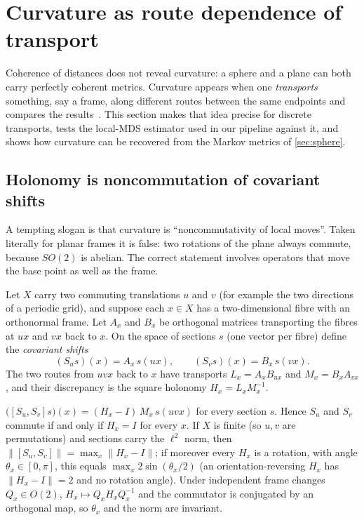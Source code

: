\documentclass[11pt]{article}
\begin{document}
 \section{Curvature as route dependence of transport}
\label{sec:curvature}

Coherence of distances does not reveal curvature: a sphere and a plane can both carry perfectly coherent metrics.
Curvature appears when one \emph{transports} something, say a frame, along different routes between the same endpoints and compares the results~\cite{Lee1997Riemannian}.
This section makes that idea precise for discrete transports, tests the local-MDS estimator used in our pipeline against it, and shows how curvature can be recovered from the Markov metrics of \cref{sec:sphere}.

\subsection{Holonomy is noncommutation of covariant shifts}
\label{sec:connection}

A tempting slogan is that curvature is ``noncommutativity of local moves''.
Taken literally for planar frames it is false: two rotations of the plane always commute, because $SO(2)$ is abelian.
The correct statement involves operators that move the base point as well as the frame.

Let $X$ carry two commuting translations $u$ and $v$ (for example the two directions of a periodic grid), and suppose each $x\in X$ has a two-dimensional fibre with an orthonormal frame.
Let $A_x$ and $B_x$ be orthogonal matrices transporting the fibres at $ux$ and $vx$ back to $x$.
On the space of sections $s$ (one vector per fibre) define the \emph{covariant shifts}
\begin{equation}
(S_us)(x)=A_x\,s(ux),\qquad (S_vs)(x)=B_x\,s(vx).
\end{equation}
The two routes from $uvx$ back to $x$ have transports $L_x=A_xB_{ux}$ and $M_x=B_xA_{vx}$, and their discrepancy is the square holonomy $H_x=L_xM_x^{-1}$.

\begin{theorem}
\label{thm:commutator}
$\bigl([S_u,S_v]s\bigr)(x)=(H_x-I)\,M_x\,s(uvx)$ for every section $s$.
Hence $S_u$ and $S_v$ commute if and only if $H_x=I$ for every $x$.
If $X$ is finite (so $u,v$ are permutations) and sections carry the $\ell^2$ norm, then $\|[S_u,S_v]\|=\max_x\|H_x-I\|$; if moreover every $H_x$ is a rotation, with angle $\theta_x\in[0,\pi]$, this equals $\max_x 2\sin(\theta_x/2)$ (an orientation-reversing $H_x$ has $\|H_x-I\|=2$ and no rotation angle).
Under independent frame changes $Q_x\in O(2)$, $H_x\mapsto Q_xH_xQ_x^{-1}$ and the commutator is conjugated by an orthogonal map, so $\theta_x$ and the norm are invariant.
\end{theorem}
\end{document}
